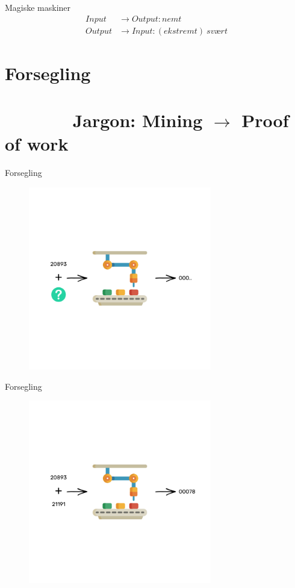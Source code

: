 \documentclass[usenames, dvipsnames]{beamer}
\begin{document}
  \begin{frame}{Magiske maskiner}
    \begin{align*}
        Input &\to Output: nemt \\
        Output &\to Input: (ekstremt) \ svært
    \end{align*}
  \end{frame}
  \section{Forsegling  \ \ \ \ \ \ \ \ \ \ \ \ \ \ \ \ \ \ \ \ \ \ \ \ \ \ \ \ \ \ \ \ \ \ \ \ \ \ \small Jargon: Mining $\to$ Proof of work}
  \begin{frame}{Forsegling}
    \begin{figure}[ht!]
    \centering
    \includegraphics[width=80mm]{images/magic_machine_combination.png}
    \end{figure}
  \end{frame}
  \begin{frame}{Forsegling}
    \begin{figure}[ht!]
    \centering
    \includegraphics[width=80mm]{images/magic_machine_combination_found.png}
    \end{figure}
  \end{frame}
\end{document}
